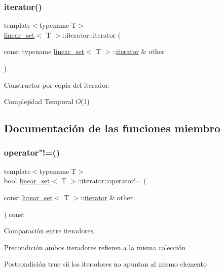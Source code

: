 \subsubsection{\texorpdfstring{iterator()}{iterator()}}
{\footnotesize\ttfamily template$<$typename T$>$ \\
\mbox{\hyperlink{classlinear__set}{linear\+\_\+set}}$<$ T $>$\+::iterator\+::iterator (\begin{DoxyParamCaption}\item[{const typename \mbox{\hyperlink{classlinear__set}{linear\+\_\+set}}$<$ T $>$\+::\mbox{\hyperlink{classlinear__set_1_1iterator}{iterator}} \&}]{other }\end{DoxyParamCaption})}



Constructor por copia del iterador. 


\begin{DoxyDescription}
\item[Complejidad Temporal]$O$(1)
\end{DoxyDescription}

\subsection{Documentación de las funciones miembro}
\mbox{\label{classlinear__set_1_1iterator_affb630273ef7a10310947c05e736f2a9}} 
\subsubsection{\texorpdfstring{operator"!=()}{operator!=()}}
{\footnotesize\ttfamily template$<$typename T$>$ \\
bool \mbox{\hyperlink{classlinear__set}{linear\+\_\+set}}$<$ T $>$\+::iterator\+::operator!= (\begin{DoxyParamCaption}\item[{const \mbox{\hyperlink{classlinear__set}{linear\+\_\+set}}$<$ T $>$\+::\mbox{\hyperlink{classlinear__set_1_1iterator}{iterator}} \&}]{other }\end{DoxyParamCaption}) const}



Comparación entre iteradores. 

\begin{DoxyPrecond}{Precondición}
ambos iteradores refieren a la misma colección 
\end{DoxyPrecond}
\begin{DoxyPostcond}{Postcondición}
true sii los iteradores no apuntan al mismo elemento
\end{DoxyPostcond}


